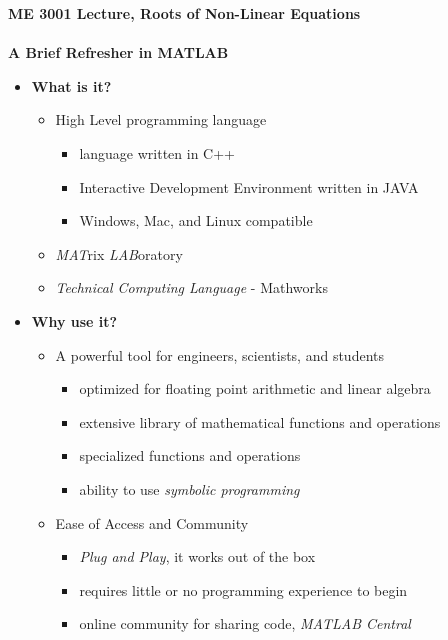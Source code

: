 \documentclass[11pt]{article}
\begin{document}
\textbf{ \LARGE ME 3001 Lecture, Roots of Non-Linear Equations} \\\\
\textbf{ \LARGE A Brief Refresher in MATLAB} \\

\begin{itemize}

	\item  \textbf{\LARGE What is it?}
		\LARGE
		\begin{itemize}
			\item High Level programming language
				\begin{itemize}
					\item language written in C++
					\item Interactive Development Environment written in JAVA 
					\item Windows, Mac, and Linux compatible
				\end{itemize}
			\item {\it MAT}rix {\it LAB}oratory
			\item {\it Technical Computing Language} - Mathworks
		\end{itemize}	

	\item \textbf{\LARGE Why use it?}
		\begin{itemize}
			\item A powerful tool for engineers, scientists, and students
				\begin{itemize}	
					\item  optimized for floating point arithmetic and linear algebra
					\item extensive library of mathematical functions and operations 
					\item specialized functions and operations
						\begin{itemize}
						\end{itemize}
					\item ability to use {\it symbolic programming }	
				\end{itemize}
			\item Ease of Access and Community
				\begin{itemize}
					\item {\it Plug and Play}, it works out of the box
					\item requires little or no programming experience to begin
					\item online community for sharing code,  {\it MATLAB Central}
				\end{itemize}
		\end{itemize}


\end{itemize}
\end{document}
